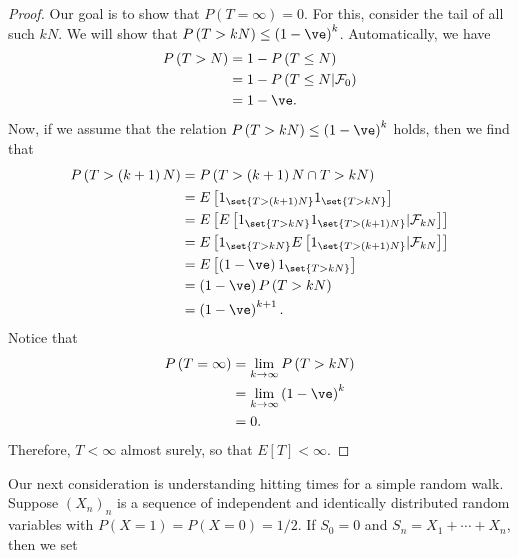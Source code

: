 \documentclass[10pt]{mypackage}
\begin{document}
\begin{proof}
  Our goal is to show that $P\left( T = \infty \right) = 0$. For this, consider the tail of all such $kN$. We will show that $P\left( T > kN \right)\leq \left( 1-\ve \right)^{k}$. Automatically, we have
  \begin{align*}
    P\left( T > N \right) &= 1-P\left( T\leq N \right)\\
                          &= 1- P\left( T\leq N | \mathcal{F}_{0} \right)\\
                          &= 1- \ve.
  \end{align*}
  Now, if we assume that the relation $P\left( T > kN \right)\leq \left( 1-\ve \right)^{k}$ holds, then we find that
  \begin{align*}
    P\left( T > \left( k+1 \right)N \right) &= P\left( T > \left( k+1 \right)N\cap T > kN \right)\\
                                            &= E\left[ 1_{\set{T> \left( k+1 \right)N}}1_{\set{T> kN}} \right]\\
                                            &= E\left[ E\left[ 1_{\set{T > kN}}1_{\set{T > \left( k+1 \right)N}}|\mathcal{F}_{kN} \right] \right]\\
                                            &= E\left[ 1_{\set{T> kN}} E\left[ 1_{\set{T> \left( k+1 \right)N}}|\mathcal{F}_{kN} \right] \right]\\
                                            &= E\left[ \left( 1-\ve \right)1_{\set{T > kN}} \right]\\
                                            &= \left( 1-\ve \right)P\left( T > kN \right)\\
                                            &= \left( 1-\ve \right)^{k+1}.
  \end{align*}
  Notice that
  \begin{align*}
    P\left( T = \infty \right) &= \lim_{k\to\infty} P\left( T > kN \right)\\
                               &= \lim_{k\to\infty} \left( 1-\ve \right)^{k}\\
                               &= 0.
  \end{align*}
  Therefore, $T < \infty$ almost surely, so that $E\left[ T \right] < \infty$.
\end{proof}
Our next consideration is understanding hitting times for a simple random walk. Suppose $\left( X_n \right)_{n}$ is a sequence of independent and identically distributed random variables with $P \left( X=1 \right) = P\left( X = 0 \right) = 1/2$. If $S_0 = 0$ and $S_n = X_1 + \cdots + X_n$, then we set
\end{document}
